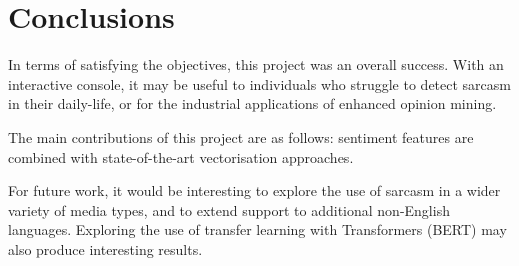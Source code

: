 \documentclass[12pt,a4paper]{article}
\begin{document}
\section{Conclusions}
In terms of satisfying the objectives, this project was an overall success. With an interactive console, it may be useful to individuals who struggle to detect sarcasm in their daily-life, or for the industrial applications of enhanced opinion mining.

The main contributions of this project are as follows: sentiment features are combined with state-of-the-art vectorisation approaches. 

For future work, it would be interesting to explore the use of sarcasm in a wider variety of media types, and to extend support to additional non-English languages. Exploring the use of transfer learning with Transformers (BERT) may also produce interesting results.







\end{document}
